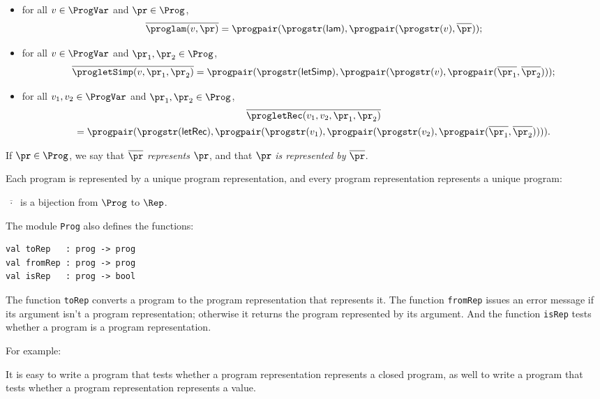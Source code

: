 \begin{itemize}
\item for all $v\in\ProgVar$ and $\pr\in\Prog$,
  \begin{displaymath}
  \overline{\proglam(v,\pr)} =
  \progpair(\progstr(\mathsf{lam}),
  \progpair(\progstr(v), \overline{\pr})) ;
  \end{displaymath}

\item for all $v\in\ProgVar$ and $\pr_1,\pr_2\in\Prog$,
  \begin{displaymath}
    \overline{\progletSimp(v,\pr_1,\pr_2)} =
    \progpair(\progstr(\mathsf{letSimp}),
    \progpair(\progstr(v),
    \progpair(\overline{\pr_1}, \overline{\pr_2}))) ;
  \end{displaymath}

\item for all $v_1,v_2\in\ProgVar$ and $\pr_1,\pr_2\in\Prog$,
  \begin{multline*}
  \overline{\progletRec(v_1,v_2,\pr_1,\pr_2)} \\
  = \progpair(\progstr(\mathsf{letRec}),
  \progpair(\progstr(v_1),
  \progpair(\progstr(v_2),
  \progpair(\overline{\pr_1}, \overline{\pr_2})))) .
  \end{multline*}
\end{itemize}
If $\pr\in\Prog$, we say that $\overline{\pr}$ \emph{represents} $\pr$,
and that $\pr$ \emph{is represented by} $\overline{\pr}$.

Each program is represented by a unique program representation, and
every program representation represents a unique program:

\begin{proposition}
$\overline{\;\cdot\;}$ is a bijection from $\Prog$ to $\Rep$.
\end{proposition}

The module \texttt{Prog} also defines the functions:
\begin{verbatim}
val toRep   : prog -> prog
val fromRep : prog -> prog
val isRep   : prog -> bool
\end{verbatim}
The function \texttt{toRep} converts a program to the program representation
that represents it.  The function \texttt{fromRep} issues an error message
if its argument isn't a program representation; otherwise it returns the
program represented by its argument.  And the function \texttt{isRep} tests
whether a program is a program representation.

For example:


It is easy to write a program that tests whether a program
representation represents a closed program, as well to write a program
that tests whether a program representation represents a value.

